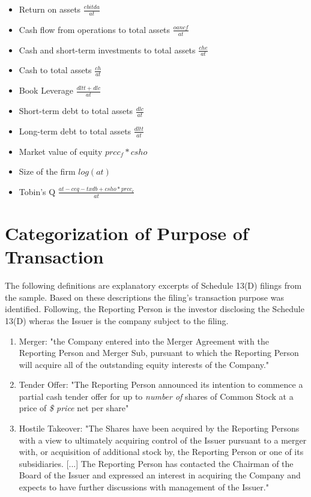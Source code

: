 \documentclass[12pt]{article}
\begin{document}
\begin{appendices}
	\begin{itemize}
	\renewcommand\labelitemi{--}
		\item Return on assets $\frac{ebitda}{at}$
		\item Cash flow from operations to total assets $\frac{oancf}{at}$
		\item Cash and short-term investments to total assets $\frac{che}{at}$
		\item Cash to total assets $\frac{ch}{at}$
		\item Book Leverage \citep[p.1440]{MacKay2005} $\frac{dltt+dlc}{at}$
		\item Short-term debt to total assets $\frac{dlc}{at}$ 
		\item Long-term debt to total assets $\frac{dltt}{at}$
		\item Market value of equity $prcc_f*csho$
		\item Size of the firm $log(at)$
		\item Tobin's Q \citep[p.120]{Khatami2014} $\frac{at-ceq-txdb+csho*prcc_c}{at}$
	\end{itemize}

\section{Categorization of Purpose of Transaction}

\noindent The following definitions are explanatory excerpts of Schedule 13(D) filings from the sample. Based on these descriptions the filing's transaction purpose was identified. Following, the Reporting Person is the investor disclosing the Schedule 13(D) wheras the Issuer is the company subject to the filing. 
\begin{enumerate}
	

\item Merger: "the Company entered into the Merger Agreement with the Reporting Person and Merger Sub, pursuant to which the Reporting Person will acquire all of the outstanding equity interests of the Company."

\item Tender Offer: "The Reporting Person announced its intention to commence a partial cash tender offer for up to \emph{number of} shares of Common Stock at a price of \emph{\$ price} net per share"

\item Hostile Takeover: "The Shares have been acquired by the Reporting Persons with a view to ultimately acquiring  control of the Issuer  pursuant to a merger with, or  acquisition of additional  stock  by,  the Reporting Person  or one of its  subsidiaries. [...]
The Reporting Person has contacted the Chairman of the Board of the Issuer and expressed an interest in acquiring the Company and expects to have further discussions  with management of the Issuer."


\end{enumerate}
\end{appendices}
\end{document}
